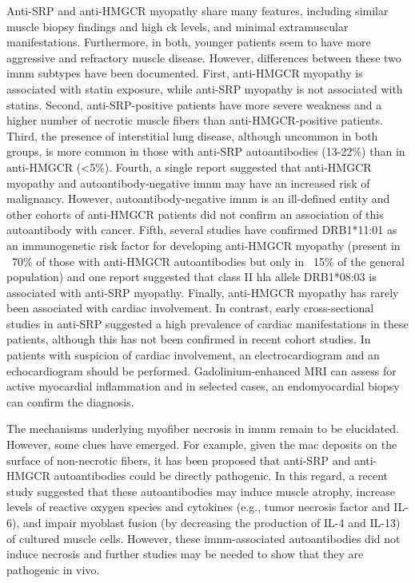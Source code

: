Anti-SRP and anti-HMGCR myopathy share many features, including similar muscle biopsy findings and high \gls{ck} levels, and minimal extramuscular manifestations.\cite{Watanabe2016} Furthermore, in both, younger patients seem to have more aggressive and refractory muscle disease.\cite{PinalFernandez2017b,Tiniakou2017} However, differences between these two \gls{imnm} subtypes have been documented. First, anti-HMGCR myopathy is associated with statin exposure,\cite{ChristopherStine2010} while anti-SRP myopathy is not associated with statins.\cite{PinalFernandez2017b,Suzuki2015} Second, anti-SRP-positive patients have more severe weakness and a higher number of necrotic muscle fibers than anti-HMGCR-positive patients.\cite{PinalFernandez2017b,Watanabe2016,Allenbach2018} Third, the presence of interstitial lung disease, although uncommon in both groups, is more common in those with anti-SRP autoantibodies (13-22\%) than in anti-HMGCR (<5\%).\cite{PinalFernandez2017b,Suzuki2015,Watanabe2016,Tiniakou2017} Fourth, a single report suggested that anti-HMGCR myopathy and autoantibody-negative \gls{imnm} may have an increased risk of malignancy.\cite{Allenbach2016} However, autoantibody-negative \gls{imnm} is an ill-defined entity and other cohorts of anti-HMGCR patients did not confirm an association of this autoantibody with cancer.\cite{Tiniakou2017,Watanabe2016} Fifth, several studies have confirmed DRB1*11:01 as an immunogenetic risk factor for developing anti-HMGCR myopathy (present in ~70\% of those with anti-HMGCR autoantibodies but only in ~15\% of the general population) and one report suggested that class II \gls{hla} allele DRB1*08:03 is associated with anti-SRP myopathy.\cite{Ohnuki2016,Mammen2012,Limaye2015} Finally, anti-HMGCR myopathy has rarely been associated with cardiac involvement.\cite{Watanabe2016} In contrast, early cross-sectional studies in anti-SRP suggested a high prevalence of cardiac manifestations in these patients,\cite{Targoff1990,Kao2004} although this has not been confirmed in recent cohort studies.\cite{PinalFernandez2017b,Suzuki2015,Watanabe2016} In patients with suspicion of cardiac involvement, an electrocardiogram and an echocardiogram should be performed. Gadolinium-enhanced MRI can assess for active myocardial inflammation and in selected cases, an endomyocardial biopsy can confirm the diagnosis.\cite{Chen2018}

The mechanisms underlying myofiber necrosis in \gls{imnm} remain to be elucidated. However, some clues have emerged. For example, given the \gls{mac} deposits on the surface of non-necrotic fibers, it has been proposed that anti-SRP and anti-HMGCR autoantibodies could be directly pathogenic.\cite{Allenbach2018} In this regard, a recent study suggested that these autoantibodies may induce muscle atrophy, increase levels of reactive oxygen species and cytokines (e.g., tumor necrosis factor and IL-6), and impair myoblast fusion (by decreasing the production of IL-4 and IL-13) of cultured muscle cells.\cite{AroucheDelaperche2017} However, these \gls{imnm}-associated autoantibodies did not induce necrosis and further studies may be needed to show that they are pathogenic in vivo.\cite{AroucheDelaperche2017}

